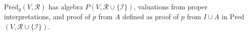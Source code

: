 Pred$_g(V, \mathcal{R})$ has algebra $P(V, \mathcal{R} \cup \{\mathcal{I}\})$, valuations from proper interpretations, and proof of $p$ from $A$ defined as proof of $p$ from $I \cup A$ in Pred$(V, \mathcal{R} \cup \{\mathcal{I}\})$.
